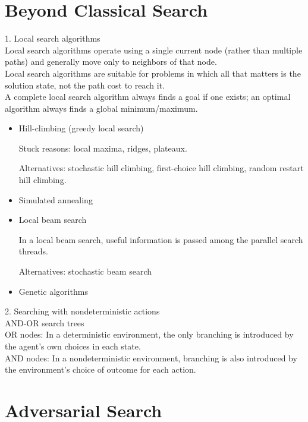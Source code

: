 \documentclass[12pt]{article}
\begin{document}
\section*{Beyond Classical Search}

1. Local search algorithms \\

Local search algorithms operate using a single current node (rather than multiple paths) and generally move only to neighbors of that node. \\

Local search algorithms are suitable for problems in which all that matters is the solution state, not the path cost to reach it. \\

A complete local search algorithm always finds a goal if one exists; an optimal algorithm always finds a global minimum/maximum.

\begin{itemize} 
  \item Hill-climbing (greedy local search)

    Stuck reasons: local maxima, ridges, plateaux.

    Alternatives: stochastic hill climbing, first-choice hill climbing, random restart hill climbing.
  \item Simulated annealing
  \item Local beam search

    In a local beam search, useful information is passed among the parallel search threads.

    Alternatives: stochastic beam search
  \item Genetic algorithms
\end{itemize}

2. Searching with nondeterministic actions \\

AND-OR search trees \\

OR nodes: In a deterministic environment, the only branching is introduced by the agent's own choices in each state. \\

AND nodes: In a nondeterministic environment, branching is also introduced by the environment's choice of outcome for each action.

\section*{Adversarial Search}
\end{document}
